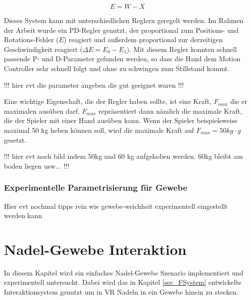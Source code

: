 \begin{equation}
E = W - X
\label{form_error}
\end{equation}

Dieses System kann mit unterschiedlichen Reglern geregelt werden. Im Rahmen der Arbeit wurde ein PD-Regler genutzt, der proportional zum Positions- und Rotations-Fehler ($E$) reagiert und außerdem proportional zur derzeitigen Geschwindigkeit reagiert ($\Delta E = E_0 - E_1$). Mit diesem Regler konnten schnell passende P- und D-Parameter gefunden werden, so dass die Hand dem Motion Controller sehr schnell folgt und ohne zu schwingen zum Stillstand kommt.

!!! hier evt die parameter angeben die gut geeignet waren !!!

Eine wichtige Eigenschaft, die der Regler haben sollte, ist eine Kraft, $F_{max}$ die er maximalen ausüben darf. $F_{max}$ repräsentiert dann nämlich die maximale Kraft, die der Spieler mit einer Hand ausüben kann. Wenn der Spieler beispielsweise maximal 50 kg heben können soll, wird die maximale Kraft auf $F_{max} = 50kg \cdot g$ gesetzt.

!!! hier evt noch bild indem 50kg und 60 kg aufgehoben werden. 60kg bleibt am boden liegen usw... !!!

\subsubsection{Experimentelle Parametrisierung für Gewebe}

Hier evt nochmal tipps rein wie gewebe-weichheit experimentell eingestellt werden kann

\section{Nadel-Gewebe Interaktion}%
\label{sec_needle}


In diesem Kapitel wird ein einfaches Nadel-Gewebe Szenario implementiert und experimentell untersucht. Dabei wird das in Kapitel \ref{sec_FSystem} entwickelte Interaktionsystem genutzt um in VR Nadeln in ein Gewebe hinein zu stecken. 

